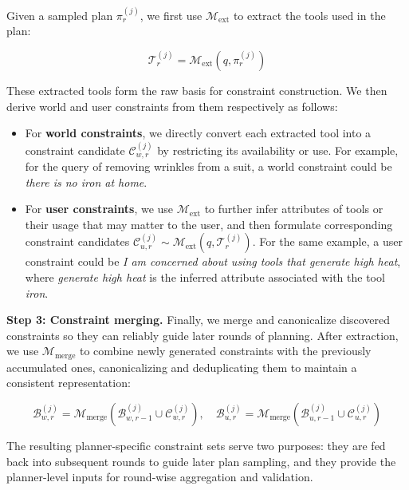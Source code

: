 Given a sampled plan {\small $\pi^{(j)}_{r}$}, we first use $\mathcal{M}_{\mathrm{ext}}$ to extract the tools used in the plan:
\begin{footnotesize}
\begin{equation}
\mathcal{T}^{(j)}_{r} = \mathcal{M}_{\mathrm{ext}}(q, \pi^{(j)}_{r})
\end{equation}
\end{footnotesize}
These extracted tools form the raw basis for constraint construction. We then derive world and user constraints from them respectively as follows:
\begin{itemize}[topsep=-1.5pt, leftmargin=10pt, itemsep=0pt]
\item For \textbf{world constraints}, we directly convert each extracted tool into a constraint candidate {\small $\mathcal{C}^{(j)}_{w,r}$} by restricting its availability or use. For example, for the query of removing wrinkles from a suit, a world constraint could be \textit{there is no iron at home}.
\item For \textbf{user constraints}, we use $\mathcal{M}_{\mathrm{ext}}$ to further infer attributes of tools or their usage that may matter to the user, and then formulate corresponding constraint candidates {\small $\mathcal{C}^{(j)}_{u,r} \sim \mathcal{M}_{\mathrm{ext}}(q, \mathcal{T}^{(j)}_{r})$}.
For the same example, a user constraint could be \textit{I am concerned about using tools that generate high heat}, where \textit{generate high heat} is the inferred attribute associated with the tool \textit{iron}.
\end{itemize}

\noindent\textbf{Step 3: Constraint merging.}
Finally, we merge and canonicalize discovered constraints so they can reliably guide later rounds of planning.
After extraction, we use $\mathcal{M}_{\mathrm{merge}}$ to combine newly generated constraints with the previously accumulated ones, canonicalizing and deduplicating them to maintain a consistent representation:
\begin{footnotesize}
\begin{equation}
\mathcal{B}^{(j)}_{w,r} = \mathcal{M}_{\mathrm{merge}}(\mathcal{B}^{(j)}_{w,r-1} \cup \mathcal{C}^{(j)}_{w,r}), \quad
\mathcal{B}^{(j)}_{u,r} = \mathcal{M}_{\mathrm{merge}}(\mathcal{B}^{(j)}_{u,r-1} \cup \mathcal{C}^{(j)}_{u,r})
\end{equation}
\end{footnotesize}
The resulting planner-specific constraint sets serve two purposes: they are fed back into subsequent rounds to guide later plan sampling, and they provide the planner-level inputs for round-wise aggregation and validation.

